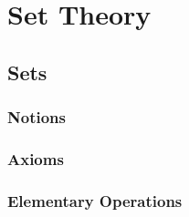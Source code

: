 \documentclass{book}
\begin{document}
\part{Set Theory}
	\chapter{Sets}
		\section{Notions}
		
		\section{Axioms}
		
		\section{Elementary Operations}
		
\end{document}
